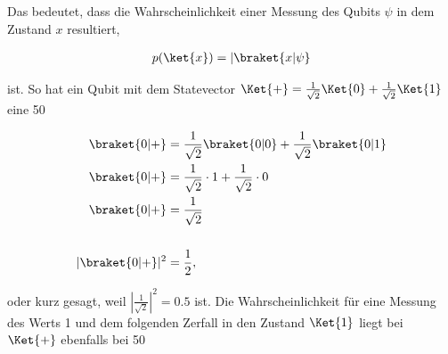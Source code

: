 Das bedeutet, dass die Wahrscheinlichkeit einer Messung des Qubits \(\psi\) in dem Zustand \(x\) resultiert,

\begin{equation} \begin{gathered}
        p(\ket{x}) = | \braket{x | \psi}
    \end{gathered} \end{equation}

ist. So hat ein Qubit mit dem Statevector \( \Ket{+} = \frac{1}{\sqrt{2}} \Ket{0} + \frac{1}{\sqrt{2}}  \Ket{1}\) eine 50%

\begin{align*}
    \braket{0 | +}       & = \frac{1}{\sqrt{2}}  \braket{0 |0} + \frac{1}{\sqrt{2}}  \braket{0 | 1} \\
    \braket{0 | +}       & = \frac{1}{\sqrt{2}} \cdot 1 + \frac{1}{\sqrt{2}} \cdot 0                \\
    \braket{0 | +}       & = \frac{1}{\sqrt{2}}                                                     \\
    \\
    | \braket{0 | +} |^2 & = \frac{1}{2},
\end{align*}

oder kurz gesagt, weil \(|\frac{1}{\sqrt{2}}|^2 = 0.5\) ist. Die Wahrscheinlichkeit für eine Messung des Werts 1 und dem folgenden Zerfall in den Zustand \(\Ket{1}\)  liegt bei \(\Ket{+}\) ebenfalls bei 50%

\newline
\newline
{}


\newline \newline


